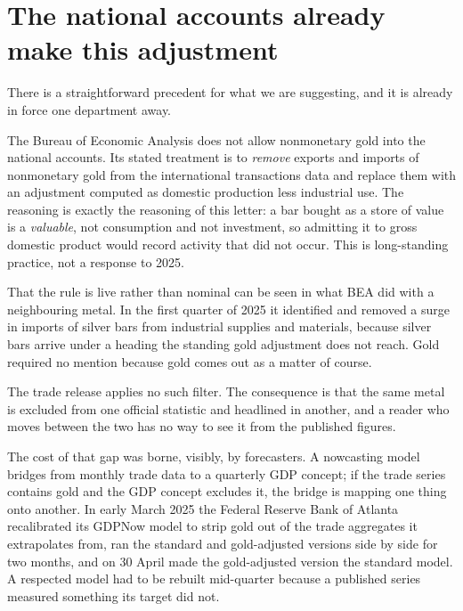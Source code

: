 \documentclass[11pt]{article}
\begin{document}
\section{The national accounts already make this adjustment}

There is a straightforward precedent for what we are suggesting, and it is
already in force one department away.

The Bureau of Economic Analysis does not allow nonmonetary gold into the
national accounts. Its stated treatment is to \emph{remove} exports and imports
of nonmonetary gold from the international transactions data and replace them
with an adjustment computed as domestic production less industrial use. The reasoning is exactly the reasoning of this
letter: a bar bought as a store of value is a \emph{valuable}, not consumption
and not investment, so admitting it to gross domestic product would record
activity that did not occur. This is long-standing practice, not a response to
2025.

That the rule is live rather than nominal can be seen in what BEA did with a
neighbouring metal. In the first quarter of 2025 it identified and removed a
surge in imports of silver bars from industrial supplies and materials, because
silver bars arrive under a heading the standing gold adjustment does not reach.
Gold required no mention because gold comes out as a matter of course.

The trade release applies no such filter. The consequence is that the same metal
is excluded from one official statistic and headlined in another, and a reader
who moves between the two has no way to see it from the published figures.

The cost of that gap was borne, visibly, by forecasters. A nowcasting model
bridges from monthly trade data to a quarterly GDP concept; if the trade series
contains gold and the GDP concept excludes it, the bridge is mapping one thing
onto another. In early March 2025 the Federal Reserve Bank of Atlanta
recalibrated its GDPNow model to strip gold out of the trade aggregates it
extrapolates from, ran the standard and gold-adjusted versions side by side for
two months, and on 30 April made the gold-adjusted version the standard
model. A
respected model had to be rebuilt mid-quarter because a published series
measured something its target did not.
\end{document}
